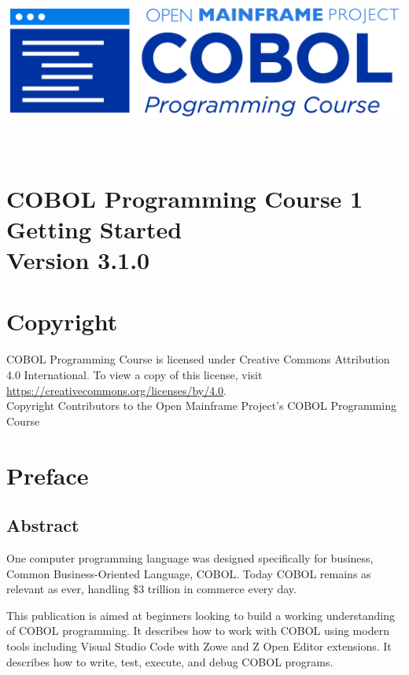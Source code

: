 \begin{center}
  \vspace*{25pt}
\includegraphics[width=\textwidth]{Images/COBOL-Programming-Course.png}
\hypertarget{cobol-programming-course-1}{%
\section*{
  \\[35pt]
  \Huge COBOL Programming Course 1 \\[10pt]
  \Huge Getting Started \\[15pt]
  \Large Version 3.1.0}\label{cobol-programming-course-1}}
\end{center}

\pagebreak
\hypertarget{copyright}{%
\section*{Copyright}{
  \normalsize COBOL Programming Course is licensed under Creative Commons 
  Attribution 4.0 International. To view a copy of this license, visit 
  \href{https://creativecommons.org/licenses/by/4.0}{https://creativecommons.org/licenses/by/4.0}. \\[10pt]
  Copyright Contributors to the Open Mainframe Project's COBOL Programming Course}\label{copyright}}
\pagebreak

\hypertarget{preface}{%
\section*{Preface}\label{preface}}

\hypertarget{abstract}{%
\subsection*{Abstract}\label{abstract}}

One computer programming language was designed specifically for
business, Common Business-Oriented Language, COBOL. Today COBOL remains
as relevant as ever, handling \$3 trillion in commerce every day.

This publication is aimed at beginners looking to build a working
understanding of COBOL programming. It describes how to work with COBOL
using modern tools including Visual Studio Code with Zowe and Z Open
Editor extensions. It describes how to write, test, execute, and debug
COBOL programs.

